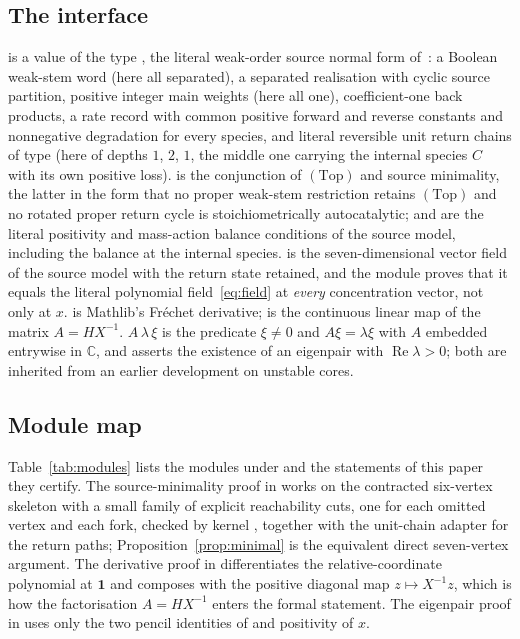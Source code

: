 \documentclass[11pt,a4paper]{article}
\theoremstyle{plain}
\theoremstyle{definition}
\theoremstyle{remark}
\numberwithin{equation}{section}
\newcommand{\C}{\mathbb{C}}
\newcommand{\one}{\mathbf{1}}
\renewcommand{\Re}{\operatorname{Re}}
\newcommand{\Top}{\mathrm{(Top)}}
\begin{document}
\subsection*{The interface}
 is a value of the type , the literal weak-order source normal form of~\cite{TypeIIpos,TypeIImixed}: a Boolean weak-stem word (here all separated), a separated realisation with cyclic source partition, positive integer main weights (here all one), coefficient-one back products, a rate record with common positive forward and reverse constants and nonnegative degradation for every species, and literal reversible unit return chains of type  (here of depths $1$, $2$, $1$, the middle one carrying the internal species $C$ with its own positive loss).  is the conjunction of $\Top$ and source minimality, the latter in the form that no proper weak-stem restriction retains $\Top$ and no rotated proper return cycle is stoichiometrically autocatalytic;  and  are the literal positivity and mass-action balance conditions of the source model, including the balance at the internal species.  is the seven-dimensional vector field of the source model with the return state retained, and the module  proves that it equals the literal polynomial field~\eqref{eq:field} at \emph{every} concentration vector, not only at $x$.  is Mathlib's Fr\'echet derivative;  is the continuous linear map of the matrix $A=HX^{-1}$.  $A\,\lambda\,\xi$ is the predicate $\xi\ne0$ and $A\xi=\lambda\xi$ with $A$ embedded entrywise in $\C$, and  asserts the existence of an eigenpair with $\Re\lambda>0$; both are inherited from an earlier development on unstable cores.

\subsection*{Module map}
Table~\ref{tab:modules} lists the modules under  and the statements of this paper they certify. The source-minimality proof in  works on the contracted six-vertex skeleton with a small family of explicit reachability cuts, one for each omitted vertex and each fork, checked by kernel , together with the unit-chain adapter for the return paths; Proposition~\ref{prop:minimal} is the equivalent direct seven-vertex argument. The derivative proof in  differentiates the relative-coordinate polynomial at $\one$ and composes with the positive diagonal map $z\mapsto X^{-1}z$, which is how the factorisation $A=HX^{-1}$ enters the formal statement. The eigenpair proof in  uses only the two pencil identities of  and positivity of $x$.
\end{document}
